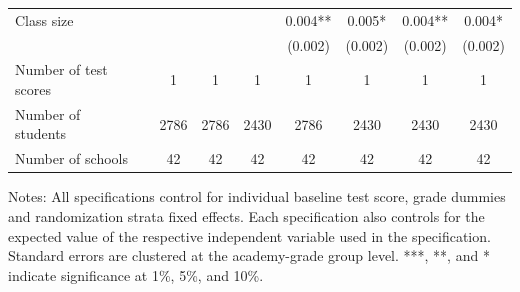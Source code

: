 \begin{center}
\begin{scriptsize}
\begin{threeparttable}
\begin{tabular} {@{} l l c c c c c c c  @{}}
Class size &  &  &  &  & 0.004** & 0.005* & 0.004** & 0.004* \\
                 &  &  &  &  & (0.002) & (0.002) & (0.002) & (0.002) \\
\midrule
Number of test scores &  & 1 & 1 & 1 & 1 & 1 & 1 & 1 \\
Number of students &  & 2786 & 2786 & 2430 & 2786 & 2430 & 2430 & 2430 \\
Number of schools &  & 42 & 42 & 42 & 42 & 42 & 42 & 42 \\
\bottomrule
\end{tabular}
\begin{tablenotes}
\item Notes: All specifications control for individual baseline test score, grade dummies and randomization strata fixed effects. Each specification also controls for the expected value of the respective independent variable used in the specification. Standard errors are clustered at the academy-grade group level. ***, **, and * indicate significance at 1\%, 5\%, and 10\%.\end{tablenotes}
\end{threeparttable}
\end{scriptsize}
\end{center}
\clearpage
